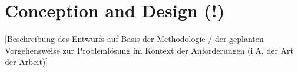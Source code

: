 \chapter{Conception and Design (!)}
[Beschreibung des Entwurfs auf Basis der Methodologie / der geplanten Vorgehensweise zur Probleml\"osung im Kontext der Anforderungen (i.A. der Art der Arbeit)]




